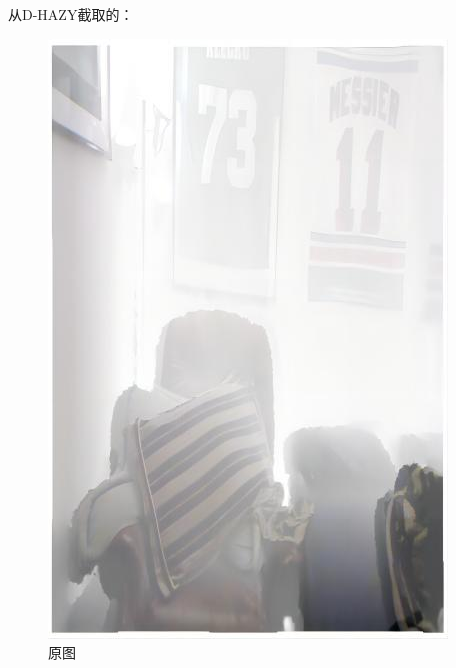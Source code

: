 \documentclass[12pt]{article}
\begin{document}
 从D-HAZY截取的：\begin{figure}[!h]
    \centering
    \begin{minipage}[t]{0.24\linewidth}
        \centering
        \includegraphics[width=0.9\linewidth]{sample_pictures/D-HAZY-example.jpg}
        \caption*{原图}
    \end{minipage}
    \begin{minipage}[t]{0.24\linewidth}
        \centering

\end{minipage}
\end{figure}
\end{document}
